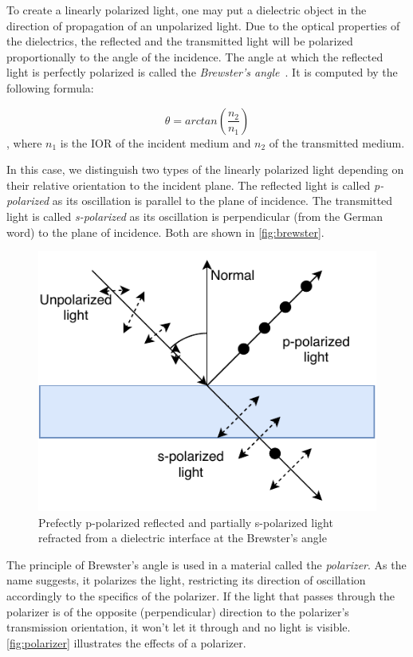 To create a linearly polarized light, one may put a dielectric object in the direction of propagation of an unpolarized light. Due to the optical properties of the dielectrics, the reflected and the transmitted light will be polarized proportionally to the angle of the incidence. The angle at which the reflected light is perfectly polarized is called the \emph{Brewster's angle}~\cite{brewster1815laws}. It is computed by the following formula:

\begin{equation}
\theta=arctan(\frac{n_2}{n_1})
\end{equation}
, where $n_1$ is the IOR of the incident medium and $n_2$ of the transmitted medium.

In this case, we distinguish two types of the linearly polarized light depending on their relative orientation to the incident plane. The reflected light is called \emph{p-polarized} as its oscillation is parallel to the plane of incidence. The transmitted light is called \emph{s-polarized} as its oscillation is perpendicular (from the German word) to the plane of incidence. Both are shown in \autoref{fig:brewster}.

\begin{figure}[h]
	\centering
	\includegraphics[width=.7\linewidth]{img/brewster.pdf}
	\caption{Prefectly p-polarized reflected and partially s-polarized light refracted from a dielectric interface at the Brewster's angle}
	\label{fig:brewster}
\end{figure}


The principle of Brewster's angle is used in a material called the \emph{polarizer}. As the name suggests, it polarizes the light, restricting its direction of oscillation accordingly to the specifics of the polarizer. If the light that passes through the polarizer is of the opposite (perpendicular) direction to the polarizer's transmission orientation, it won't let it through and no light is visible. \autoref{fig:polarizer} illustrates the effects of a polarizer.

